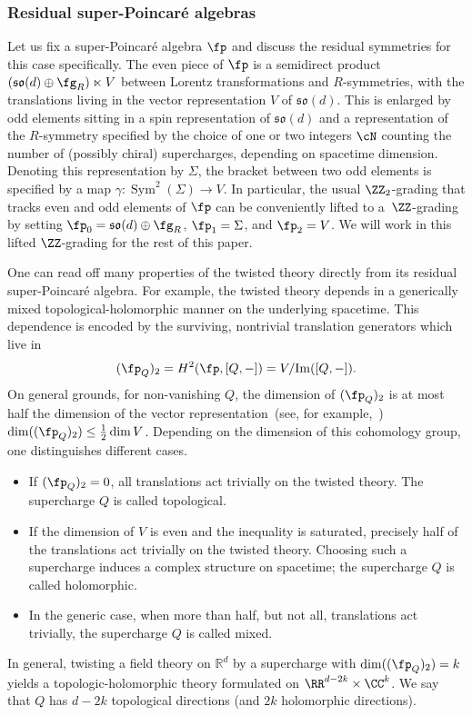 \documentclass[pdftex]{sigma}
\numberwithin{equation}{section}
\theoremstyle{definition}
\def\R{\mathbb{R}}
\def\lie#1{\ensuremath{\mathfrak{#1}}}
\DeclareMathOperator{\Sym}{Sym}
\begin{document}
\subsubsection{Residual super-Poincar\'e algebras}
Let us fix a super-Poincar\'e algebra $\fp$ and discuss the residual symmetries for this case specifically. The even piece of $\fp$ is a semidirect product $(\lie{so}(d) \oplus \fg_R) \ltimes V$ between Lorentz transformations and $R$-symmetries, with the translations living in the vector representation $V$ of $\lie{so}(d)$. This is enlarged by odd elements sitting in a spin representation of $\lie{so}(d)$ and a representation of the $R$-symmetry specified by the choice of one or two integers $\cN$ counting the number of (possibly chiral) supercharges, depending on spacetime dimension. Denoting this representation by $\Sigma$, the bracket between two odd elements is specified by a map
$
 \gamma\colon \Sym^2(\Sigma) \longrightarrow V$.
In particular, the usual $\ZZ_2$-grading that tracks even and odd elements of $\fp$ can be conveniently lifted to a~$\ZZ$-grading by setting $\fp_0 = \lie{so}(d) \oplus \fg_R$, $\fp_1 = \Sigma$, and $\fp_2 = V$. We will work in this lifted $\ZZ$-grading for the rest of this paper.

One can read off many properties of the twisted theory directly from its residual super-Poincar\'e algebra. For example, the twisted theory depends in a generically mixed topological-holomorphic manner on the underlying spacetime. This dependence is encoded by the surviving, nontrivial translation generators which live in
\[
(\fp_Q)_2 = H^2(\fp,[Q,-]) = V/\mathrm{Im}([Q,-]) .
\]
On general grounds, for non-vanishing $Q$, the dimension of $(\fp_Q)_2$ is at most half the dimension of the vector representation~(see, for example,~\cite{ElliottSafronov})
$
\dim((\fp_Q)_2) \leq \frac{1}{2} \dim V $.
Depending on the dimension of this cohomology group, one distinguishes different cases.
\begin{itemize}\itemsep=0pt
	\item[--] If $(\fp_Q)_2=0$, all translations act trivially on the twisted theory. The supercharge $Q$ is called topological.
	\item[--] If the dimension of $V$ is even and the inequality is saturated, precisely half of the translations act trivially on the twisted theory. Choosing such a supercharge induces a complex structure on spacetime; the supercharge $Q$ is called holomorphic.
	\item[--] In the generic case, when more than half, but not all, translations act trivially, the supercharge $Q$ is called mixed.
\end{itemize}
In general, twisting a field theory on $\R^d$ by a supercharge with
$
\dim((\fp_Q)_2) = k
$
yields a topologic-holomorphic theory formulated on $\RR^{d-2k} \times \CC^k$. We say that $Q$ has $d-2k$ topological directions (and $2k$ holomorphic directions).
\end{document}

